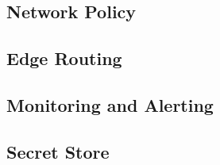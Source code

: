 \subsection{Network Policy}



\subsection{Edge Routing}



\subsection{Monitoring and Alerting}




\subsection{Secret Store}



